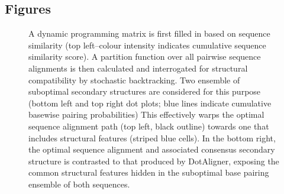 \documentclass{bmcart}
\begin{document}
\begin{backmatter}





\section*{Figures}

\begin{figure}[h!]
 \caption {
  A dynamic  programming matrix is first filled in based on sequence 
  similarity (top left--colour intensity indicates cumulative sequence similarity score). 
  A partition function over all pairwise sequence alignments is then calculated and 
  interrogated for structural compatibility by stochastic backtracking. 
  Two ensemble of suboptimal secondary structures are considered for this purpose
  (bottom left and top right dot plots; blue lines indicate cumulative basewise pairing probabilities)      This effectively warps the optimal  sequence alignment path (top left, black outline) towards one that includes structural features (striped blue cells).  In the bottom right, the optimal sequence alignment 
  and associated consensus secondary structure is contrasted to that produced 
  by DotAligner, exposing the common structural features hidden in the suboptimal 
  base pairing ensemble of both sequences. 
 }
\end{figure}



\end{backmatter}
\end{document}
